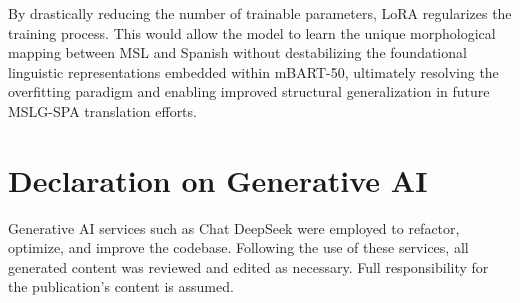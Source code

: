 \documentclass[11pt,a4paper,english]{ceurart}
\begin{document}
By drastically reducing the number of trainable parameters, LoRA regularizes the training process. This would allow the model to learn the unique morphological mapping between MSL and Spanish without destabilizing the foundational linguistic representations embedded within mBART-50, ultimately resolving the overfitting paradigm and enabling improved structural generalization in future MSLG-SPA translation efforts.

\section*{Declaration on Generative AI}
Generative AI services such as Chat DeepSeek were employed to refactor, optimize, and improve the codebase. Following the use of these services, all generated content was reviewed and edited as necessary. Full responsibility for the publication's content is assumed.


\end{document}
